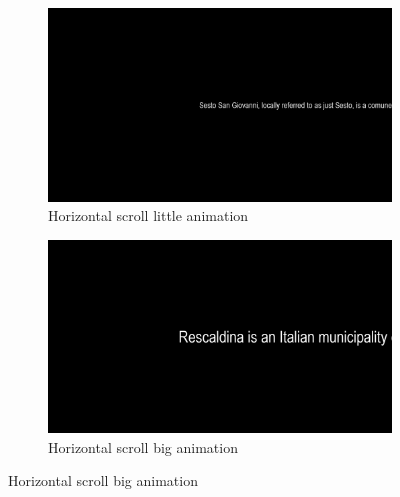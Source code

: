 \documentclass{article}
\begin{document}
\begin{figure}[ht]
    \centering
    \begin{subfigure}[b]{0.45\textwidth}
        \centering
        \includegraphics[width=1\textwidth,height=0.6\textwidth]{Images/Experiment/HS_little.png}
        \caption{Horizontal scroll little animation}
        \label{fig:HS_L}
    \end{subfigure}
    \hfill
    \begin{subfigure}[b]{0.45\textwidth}
        \centering
        \includegraphics[width=1\textwidth,height=0.6\textwidth]{Images/Experiment/HS_big.png}
        \caption{Horizontal scroll big animation}
        \label{fig:HS_B}
    \end{subfigure}
    
    \vspace{0.5em}
    

\end{figure}
\end{document}
